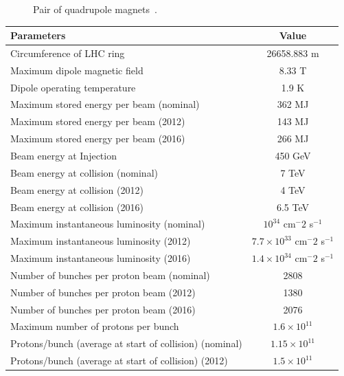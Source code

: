 {{{\begin{figure}[!htbp]
	\caption{Pair of quadrupole magnets~\cite{Vidal}.}
	\label{fig:QuadrupoleMagnet}
\end{figure}



\begin{table}
\vspace{-5.2em}
\centering
\begin{tabular}[!htbp]{l c}
\hline
{\bf Parameters} & {\bf Value} \\
\hline
Circumference of LHC ring   &   26658.883 m \\
\hline
Maximum dipole magnetic field   & 8.33 T \\
Dipole operating temperature    & 1.9 K \\
\hline
Maximum stored energy per beam (nominal) &   362 MJ \\
Maximum stored energy per beam  (2012) &   143 MJ \\
Maximum stored energy per beam  (2016) &   266 MJ \\
\hline
Beam energy at Injection    & 450 GeV \\
Beam energy at collision (nominal) &    7 TeV \\
Beam energy at collision (2012)     &   4 TeV \\
Beam energy at collision (2016)     &   6.5 TeV \\
\hline
Maximum instantaneous luminosity (nominal)  &   $10^{34}$ cm$^-2$ s$^{-1}$ \\
Maximum instantaneous luminosity (2012)     &   $7.7 \times 10^{33}$ cm$^-2$ s$^{-1}$ \\
Maximum instantaneous luminosity (2016)     &   $1.4 \times 10^{34}$ cm$^-2$ s$^{-1}$ \\
\hline
Number of bunches per proton beam (nominal) &   2808 \\
Number of bunches per proton beam (2012)    &   1380 \\
Number of bunches per proton beam (2016)    &   2076 \\
Maximum number of protons per bunch         &   $1.6 \times 10^{11}$ \\
\hline
Protons/bunch (average at start of collision) (nominal)   &   $1.15 \times 10^{11}$ \\
Protons/bunch (average at start of collision) (2012)  &   $1.5 \times 10^{11}$ \\

\end{tabular}
\end{table}}}}
